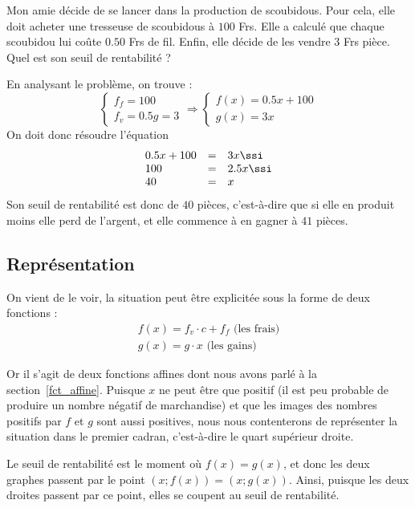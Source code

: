 \begin{exemple}\label{ex_seuil}
Mon amie décide de se lancer dans la production de scoubidous. Pour cela, elle doit acheter une tresseuse de scoubidous à $100$ Frs. Elle a calculé que chaque scoubidou lui coûte $0.50$ Frs de fil. Enfin, elle décide de les vendre $3$ Frs pièce. Quel est son seuil de rentabilité ?

En analysant le problème, on trouve :
$$
\left\{
\begin{array}{l}
f_f = 100\\
f_v = 0.5
g = 3
\end{array}
\right.
\Rightarrow
\left\{
\begin{array}{l}
f(x) = 0.5 x + 100\\
g(x) = 3x
\end{array}
\right.
$$
On doit donc résoudre l'équation
$$
\begin{array}{lcl}
0.5 x + 100 &=& 3x \ssi \\
100 &=& 2.5 x \ssi \\
40 &=& x
\end{array}
$$
Son seuil de rentabilité est donc de $40$ pièces, c'est-à-dire que si elle en produit moins elle perd de l'argent, et elle commence à en gagner à $41$ pièces.
\end{exemple}

\subsection{Représentation}

On vient de le voir, la situation peut être explicitée sous la forme de deux fonctions :
$$
\begin{array}{l}
f(x) = f_v \cdot c + f_f \mbox{ (les frais)}\\
g(x) = g\cdot x \mbox{ (les gains)}
\end{array}
$$

Or il s'agit de deux fonctions affines dont nous avons parlé à la section~\ref{fct_affine}. Puisque $x$ ne peut être que positif (il est peu probable de produire un nombre négatif de marchandise) et que les images des nombres positifs par $f$ et $g$ sont aussi positives, nous nous contenterons de représenter la situation dans le premier cadran, c'est-à-dire le quart supérieur droite.

Le seuil de rentabilité est le moment où $f(x) = g(x)$, et donc les deux graphes passent par le point $\left(x;f(x)\right) = \left(x;g(x)\right)$. Ainsi, puisque les deux droites passent par ce point, elles se coupent au seuil de rentabilité.


